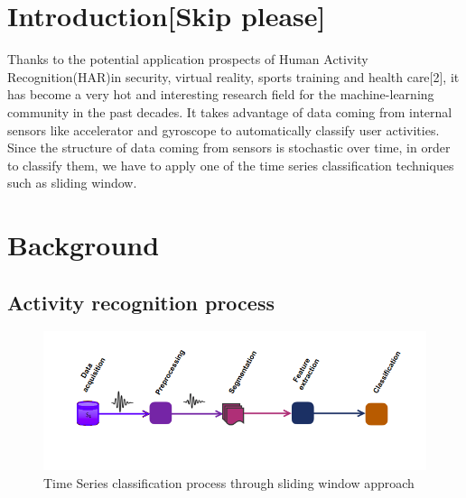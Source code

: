 \section{Introduction[Skip please]}
Thanks to the potential application prospects of Human Activity Recognition(HAR)in security, virtual reality, sports training and health care[2], it has become a very hot and interesting research field for the machine-learning community in the past decades. It takes advantage of data coming from internal sensors like accelerator and gyroscope to automatically classify user activities. Since the structure of data coming from sensors is stochastic over time, in order to classify them, we have to apply one of the time series classification techniques such as sliding window.

\section{Background}
\subsection{Activity recognition process}\label{subsec:ARP}

\begin{figure}[h]
    \centering
    \includegraphics[width=.5\textwidth]{Figures/HARP.png}
    \caption{Time Series classification process through sliding window approach}
    \label{fig:tsprocess}
\end{figure}




